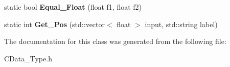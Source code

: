 \begin{DoxyCompactItemize}
\item 
\hypertarget{classToolSet_1_1Data__Type_abb19683e0fa26bb65912ede69367587a}{
static bool {\bfseries Equal\_\-Float} (float f1, float f2)}
\label{classToolSet_1_1Data__Type_abb19683e0fa26bb65912ede69367587a}

\item 
\hypertarget{classToolSet_1_1Data__Type_af1b26e30319e2a924f2b110c7e42b16c}{
static int {\bfseries Get\_\-Pos} (std::vector$<$ float $>$ input, std::string label)}
\label{classToolSet_1_1Data__Type_af1b26e30319e2a924f2b110c7e42b16c}

\end{DoxyCompactItemize}


The documentation for this class was generated from the following file:\begin{DoxyCompactItemize}
\item 
CData\_\-Type.h\end{DoxyCompactItemize}
